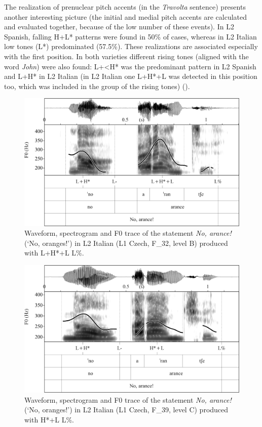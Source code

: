 The realization of prenuclear pitch accents (in the \textit{Travolta}{} sentence) presents another interesting picture (the initial and medial pitch accents are calculated and evaluated together, because of the low number of these events). In L2 Spanish, falling H+L* patterns were found in 50\% of cases, whereas in L2 Italian low tones (L*) predominated (57.5\%). These realizations are associated especially with the first position. In both varieties different rising tones (aligned with the word \textit{John}) were also found: L+<H* was the predominant pattern in L2 Spanish and L+H* in L2 Italian (in L2 Italian one L+H*+L was detected in this position too, which was included in the group of the rising tones) ().

\begin{figure}
\includegraphics[width=\textwidth]{figures/Figure_4.46.png}
\caption{Waveform, spectrogram and F0 trace of the statement \textit{No, arance!} (‘No, oranges!’) in L2 Italian (L1 Czech, F\_32, level B) produced with L+H*+L L\%.}
\label{fig:4.46}
\end{figure}

\begin{figure}
\includegraphics[width=\textwidth]{figures/Figure_4.47.png}
\caption{Waveform, spectrogram and F0 trace of the statement \textit{No, arance!} (‘No, oranges!’) in L2 Italian (L1 Czech, F\_39, level C) produced with H*+L L\%.}
\label{fig:4.47}
\end{figure}

